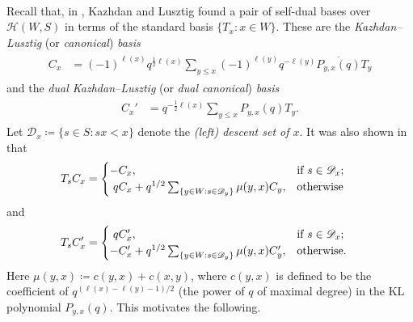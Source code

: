 \noindent\\ Recall that, in \cite{KL79}, Kazhdan and Lusztig found a pair of self-dual bases over $\mathscr{H}(W, S)$ in terms of the standard basis $\{T_x : x \in W\}$. These are the {\em Kazhdan--Lusztig} (or {\em canonical}) {\em basis}
\begin{align*}
\begin{split}
C_x &= (-1)^{\ell(x)}q^{\frac{1}{2}\ell(x)}\sum_{y \leq x} (-1)^{\ell(y)}q^{-\ell(y)}\overline{P_{y,x}(q)} T_y
\end{split}
\end{align*}
\noindent and the {\em dual Kazhdan--Lusztig} (or {\em dual canonical}) {\em basis}
\begin{align*}
\begin{split}
C_x' &= q^{-\frac{1}{2}\ell(x)}\sum_{y \leq x} P_{y,x}(q) T_y.
\end{split}
\end{align*}
\noindent Let $\mathscr{D}_x \coloneqq \{s \in S : sx < x\}$ denote the {\em (left) descent set of $x$}. It was also shown in \cite{KL79} that
\begin{align*}
\begin{split}
T_sC_x &= \begin{cases}
-C_x, &\text{if $s \in \mathscr{D}_x$;}\\
\nhphantom{$q$}\hphantom{-}qC_x + q^{1/2}\sum_{\{y \in W : s \in \mathscr{D}_y\}} \mu(y, x)C_y, &\text{otherwise}\hphantom{.}
\end{cases}
\end{split}
\end{align*}
\noindent and
\begin{align*}
\begin{split}
T_sC_x' &= \begin{cases}
\nhphantom{$q$}\hphantom{-}qC_x', &\text{if $s \in \mathscr{D}_x$;}\\
-C_x' + q^{1/2}\sum_{\{y \in W : s \in \mathscr{D}_y\}} \mu(y, x)C_y', &\text{otherwise.}
\end{cases}
\end{split}
\end{align*}
\noindent Here $\mu(y, x) \coloneqq c(y, x) + c(x, y)$, where $c(y, x)$ is defined to be the coefficient of $q^{(\ell(x)-\ell(y)-1)/2}$ (the power of $q$ of maximal degree) in the KL polynomial $P_{y,x}(q)$. This motivates the following.\\


